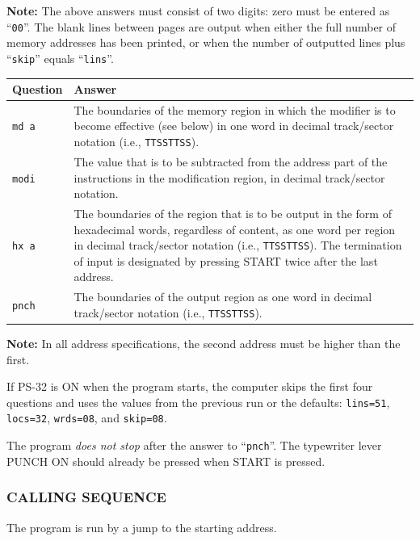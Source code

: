 \textbf{Note:} The above answers must consist of two digits: zero must be entered as ``\texttt{00}''. The blank lines between pages are output when either the full number of memory addresses has been printed, or when the number of outputted lines plus ``\texttt{skip}'' equals ``\texttt{lins}''.

\begin{table}[h!]
\centering
\begin{tabularx}{\textwidth}{lX}
\toprule
\textbf{Question} & \textbf{Answer} \\
\midrule
\texttt{md a} & The boundaries of the memory region in which the modifier is to become effective (see below) in one word in decimal track/sector notation (i.e., \texttt{TTSSTTSS}). \\
\midrule
\texttt{modi} & The value that is to be subtracted from the address part of the instructions in the modification region, in decimal track/sector notation. \\
\midrule
\texttt{hx a} & The boundaries of the region that is to be output in the form of hexadecimal words, regardless of content, as one word per region in decimal track/sector notation (i.e., \texttt{TTSSTTSS}). The termination of input is designated by pressing \textsf{START} twice after the last address. \\
\midrule
\texttt{pnch} & The boundaries of the output region as one word in decimal track/sector notation (i.e., \texttt{TTSSTTSS}). \\
\bottomrule
\end{tabularx}
\end{table}

\textbf{Note:} In all address specifications, the second address must be higher than the first.

If \textsf{PS-32} is \textsf{ON} when the program starts, the computer skips the first four questions and uses the values from the previous run or the defaults: \texttt{lins=51}, \texttt{locs=32}, \texttt{wrds=08}, and \texttt{skip=08}.

The program \emph{does not stop} after the answer to ``\texttt{pnch}''. The typewriter lever \textsf{PUNCH ON} should already be pressed when \textsf{START} is pressed.

\subsubsection*{CALLING SEQUENCE}
The program is run by a jump to the starting address.


